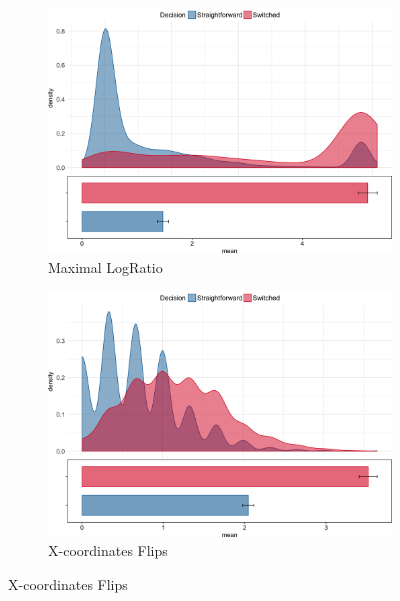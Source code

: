 \documentclass{article}
\begin{document}
\begin{figure}
%
\begin{subfigure}[b]{0.4\textwidth}
\includegraphics[width=\textwidth]{MaxRatio_calibration.png}
\caption{Maximal LogRatio}
\end{subfigure}
%
\begin{subfigure}[b]{0.4\textwidth}
\includegraphics[width=\textwidth]{Xflips_calibration.png}
\caption{X-coordinates Flips}
\end{subfigure}


\end{figure}
\end{document}
